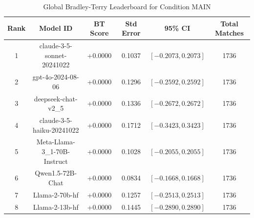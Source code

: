 \begin{table}[ht]
\centering
\caption{Global Bradley-Terry Leaderboard for Condition \textsc{MAIN}}
\label{tab:leaderboard_main}
\begin{tabular}{cccccc}
\hline
\textbf{Rank} & \textbf{Model ID} & \textbf{BT Score} & \textbf{Std Error} & \textbf{95\% CI} & \textbf{Total Matches} \\
\hline
1 & claude-3-5-sonnet-20241022 & +0.0000 & 0.1037 & $[-0.2073, 0.2073]$ & 1736 \\
2 & gpt-4o-2024-08-06 & +0.0000 & 0.1296 & $[-0.2592, 0.2592]$ & 1736 \\
3 & deepseek-chat-v2\_5 & +0.0000 & 0.1336 & $[-0.2672, 0.2672]$ & 1736 \\
4 & claude-3-5-haiku-20241022 & +0.0000 & 0.1712 & $[-0.3423, 0.3423]$ & 1736 \\
5 & Meta-Llama-3\_1-70B-Instruct & +0.0000 & 0.1028 & $[-0.2055, 0.2055]$ & 1736 \\
6 & Qwen1.5-72B-Chat & +0.0000 & 0.0834 & $[-0.1668, 0.1668]$ & 1736 \\
7 & Llama-2-70b-hf & +0.0000 & 0.1257 & $[-0.2513, 0.2513]$ & 1736 \\
8 & Llama-2-13b-hf & +0.0000 & 0.1445 & $[-0.2890, 0.2890]$ & 1736 \\
\hline
\end{tabular}
\end{table}
